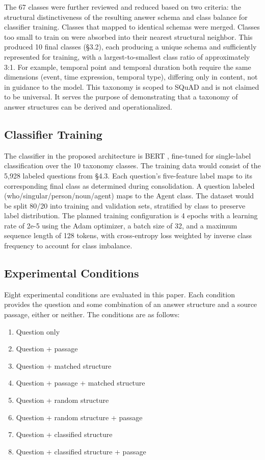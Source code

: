 \documentclass{article}
\begin{document}
The 67 classes were further reviewed and reduced based on two criteria: the structural distinctiveness of the resulting answer schema and class balance for classifier training. Classes that mapped to identical schemas were merged. Classes too small to train on were absorbed into their nearest structural neighbor. This produced 10 final classes (\S3.2), each producing a unique schema and sufficiently represented for training, with a largest-to-smallest class ratio of approximately 3:1. For example, temporal point and temporal duration both require the same dimensions (event, time expression, temporal type), differing only in content, not in guidance to the model. This taxonomy is scoped to SQuAD and is not claimed to be universal. It serves the purpose of demonstrating that a taxonomy of answer structures can be derived and operationalized.

\subsection{Classifier Training}

The classifier in the proposed architecture is BERT \cite{devlin2019bert}, fine-tuned for single-label classification over the 10 taxonomy classes. The training data would consist of the 5,928 labeled questions from \S4.3. Each question's five-feature label maps to its corresponding final class as determined during consolidation. A question labeled (who/singular/person/noun/agent) maps to the Agent class. The dataset would be split 80/20 into training and validation sets, stratified by class to preserve label distribution. The planned training configuration is 4 epochs with a learning rate of 2e-5 using the Adam optimizer, a batch size of 32, and a maximum sequence length of 128 tokens, with cross-entropy loss weighted by inverse class frequency to account for class imbalance.

\subsection{Experimental Conditions}

Eight experimental conditions are evaluated in this paper. Each condition provides the question and some combination of an answer structure and a source passage, either or neither. The conditions are as follows:

\begin{enumerate}
  \item Question only
  \item Question + passage
  \item Question + matched structure
  \item Question + passage + matched structure
  \item Question + random structure
  \item Question + random structure + passage
  \item Question + classified structure
  \item Question + classified structure + passage
\end{enumerate}
\end{document}

